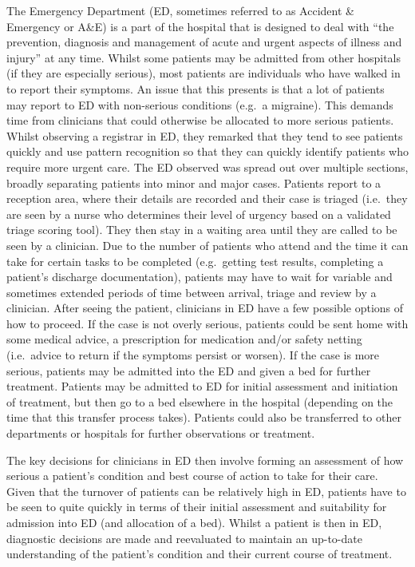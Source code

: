 \documentclass[a4paper, nobind]{templates/ociamthesis}
\begin{document}
The Emergency Department (ED, sometimes referred to as Accident \& Emergency or A\&E) is a part of the hospital that is designed to deal with ``the prevention, diagnosis and management of acute and urgent aspects of illness and injury'' \autocite{noauthor_about_2024} at any time. Whilst some patients may be admitted from other hospitals (if they are especially serious), most patients are individuals who have walked in to report their symptoms. An issue that this presents is that a lot of patients may report to ED with non-serious conditions (e.g.~a migraine). This demands time from clinicians that could otherwise be allocated to more serious patients. Whilst observing a registrar in ED, they remarked that they tend to see patients quickly and use pattern recognition so that they can quickly identify patients who require more urgent care. The ED observed was spread out over multiple sections, broadly separating patients into minor and major cases. Patients report to a reception area, where their details are recorded and their case is triaged (i.e.~they are seen by a nurse who determines their level of urgency based on a validated triage scoring tool). They then stay in a waiting area until they are called to be seen by a clinician. Due to the number of patients who attend and the time it can take for certain tasks to be completed (e.g.~getting test results, completing a patient's discharge documentation), patients may have to wait for variable and sometimes extended periods of time between arrival, triage and review by a clinician. After seeing the patient, clinicians in ED have a few possible options of how to proceed. If the case is not overly serious, patients could be sent home with some medical advice, a prescription for medication and/or safety netting (i.e.~advice to return if the symptoms persist or worsen). If the case is more serious, patients may be admitted into the ED and given a bed for further treatment. Patients may be admitted to ED for initial assessment and initiation of treatment, but then go to a bed elsewhere in the hospital (depending on the time that this transfer process takes). Patients could also be transferred to other departments or hospitals for further observations or treatment.

\hfill\break
The key decisions for clinicians in ED then involve forming an assessment of how serious a patient's condition and best course of action to take for their care. Given that the turnover of patients can be relatively high in ED, patients have to be seen to quite quickly in terms of their initial assessment and suitability for admission into ED (and allocation of a bed). Whilst a patient is then in ED, diagnostic decisions are made and reevaluated to maintain an up-to-date understanding of the patient's condition and their current course of treatment.
\end{document}
